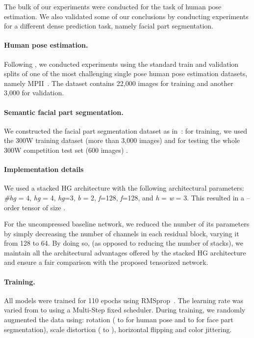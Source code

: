 \documentclass[10pt,twocolumn,letterpaper]{article}
\begin{document}
The bulk of our experiments were conducted for the task of human pose estimation. We also validated some of our conclusions by conducting experiments for a different dense prediction task, namely facial part segmentation. 

\paragraph{Human pose estimation.} Following \cite{tompson2014joint}, we conducted experiments using the standard train and validation splits of one of the most challenging single pose human pose estimation datasets, namely MPII~\cite{andriluka20142d}. The dataset contains 22,000 images for training and another 3,000 for validation.

\paragraph{Semantic facial part segmentation.} We constructed the facial part segmentation dataset as in~\cite{bulat2017binarized}: for training, we used the 300W training dataset (more than 3,000 images) and for testing  the whole 300W competition test set (600 images) \cite{sagonas2013300}.

\paragraph{Implementation details}
We used a stacked HG architecture with the following architectural parameters: \emph{\#hg} = 4, \emph{hg} = 4,  \emph{hg}=3, \emph{b} = 2, \emph{f}=128, \emph{f}=128, and \emph{h} = \emph{w} = 3.  This resulted in a --order tensor of size . 

For the uncompressed baseline network, we reduced the number of its parameters by simply decreasing the number of channels in each residual block, varying it from 128 to 64. By doing so, (as opposed to reducing the number of stacks), we maintain all the architectural advantages offered by the stacked HG architecture and ensure a fair comparison with the proposed tensorized network.

\paragraph{Training.} All models were trained for 110 epochs using \mbox{RMSprop}~\cite{tieleman2012lecture}. The learning rate was varied from  to  using a Multi-Step fixed scheduler. During training, we randomly augmented the data using: rotation ( to  for human pose and  to  for face part segmentation), scale distortion ( to ), horizontal flipping and color jittering. 
\end{document}
